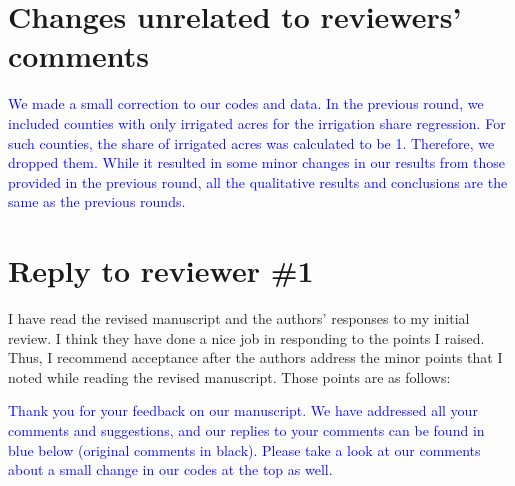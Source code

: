 \documentclass[
]{article}
\author{}
\date{\vspace{-2.5em}}
\begin{document}
\section{Changes unrelated to reviewers' comments}

\textcolor{blue}{We made a small correction to our codes and data. In the previous round, we included counties with only irrigated acres for the irrigation share regression. For such counties, the share of irrigated acres was calculated to be 1. Therefore, we dropped them. While it resulted in some minor changes in our results from those provided in the previous round, all the qualitative results and conclusions are the same as the previous rounds.}

\section{Reply to reviewer \#1}

I have read the revised manuscript and the authors' responses to my initial review. I think they have done a nice job in responding to the points I raised. Thus, I recommend acceptance after the authors address the minor points that I noted while reading the revised manuscript. Those points are as follows:

\textcolor{blue}{Thank you for your feedback on our manuscript. We have addressed all your comments and suggestions, and our replies to your comments can be found in blue below (original comments in black). Please take a look at our comments about a small change in our codes at the top as well.}
\end{document}
